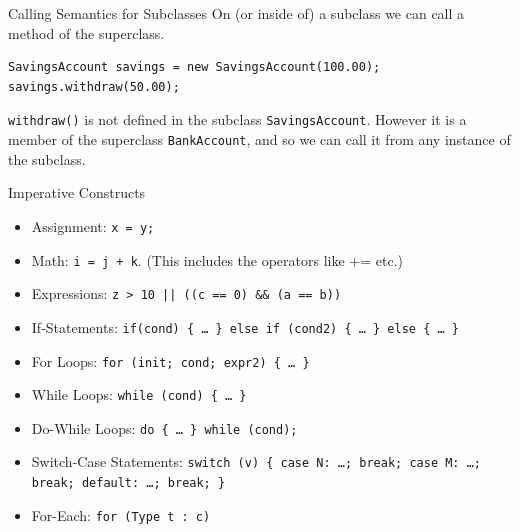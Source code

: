 \documentclass{beamer}
\begin{document}
\begin{frame}[fragile]{Calling Semantics for Subclasses}
On (or inside of) a subclass we can call a method of the superclass. \\
\vspace{1em}
\begin{Verbatim}
SavingsAccount savings = new SavingsAccount(100.00);
savings.withdraw(50.00);
\end{Verbatim}
\vspace{1em}
\texttt{withdraw()} is not defined in the subclass \texttt{SavingsAccount}. However it is a member of the superclass \texttt{BankAccount}, and so we can call it from any instance of the subclass.
\end{frame}



\begin{frame}{Imperative Constructs}
\begin{itemize}
\item Assignment: {\tt x = y;}
\item Math: {\tt i = j + k}. (This includes the operators like += etc.)
\item Expressions: {\tt z > 10 || ((c == 0) \&\& (a == b))}
\item If-Statements: {\tt if(cond) \{ \ldots~\} else if (cond2) \{ \ldots~\}  else  \{ \ldots~\} }
\item For Loops: {\tt for (init; cond; expr2) \{ \ldots~\} }
\item While Loops: {\tt while (cond) \{ \ldots~\} }
\item Do-While Loops: {\tt do \{ \ldots~\} while (cond); }
\item Switch-Case Statements: {\tt switch (v) \{ case N: \ldots; break; case M: \ldots; break; default: \ldots; break; \} }
\item For-Each: {\tt for (Type t : c)}
\end{itemize}
\end{frame}
\end{document}
